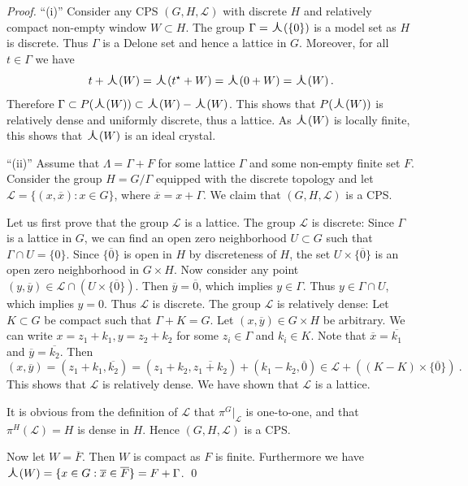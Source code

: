 \documentclass[11pt, a4wide]{amsart}
\newcommand{\oplam}{\mbox{\Large $\curlywedge$}}
\newcommand{\cL}{\mathcal L}
\numberwithin{lemma}{section}
\begin{document}
\begin{proof}

``(i)'' Consider any CPS $(G,H,\cL)$ with discrete $H$ and relatively compact non-empty window $W\subset H$.
The group $\Gamma= \oplam(\{ 0\})$ is a model set as $H$ is discrete. Thus $\Gamma$ is a Delone set and hence a  lattice in $G$. Moreover, for all $t \in \Gamma$ we have
\[
t+\oplam(W)=\oplam(t^\star+W)=\oplam(0+W)=\oplam(W) \,.
\]
Therefore $\Gamma \subset P(\oplam(W)) \subset \oplam(W)-\oplam(W)$. This shows that $ P(\oplam(W))$ is relatively dense and uniformly discrete, thus a lattice. As $\oplam(W)$ is locally finite, this shows that $\oplam(W)$ is an ideal crystal.

``(ii)''
Assume that $\Lambda=\Gamma+F$ for some lattice $\Gamma$ and some non-empty finite set $F$.
Consider the group $H = G/\Gamma$ equipped with the discrete topology and let
$\cL= \{ (x, \overline{x}) : x \in G \}$, where $\overline{x}= x+\Gamma$.  We claim that $(G, H, \cL)$ is a CPS.

Let us first prove that the group $\cL$ is a lattice.
The group $\cL$ is discrete: Since $\Gamma$ is a lattice in $G$, we can find an open zero neighborhood $U \subset G$ such that $\Gamma \cap U =\{ 0\}$. Since $\{ \overline{0} \}$ is open in $H$ by discreteness of $H$, the set $U \times \{ \overline{0} \}$ is an open zero neighborhood in $G \times H$. Now consider any point  $(y, \overline{y}) \in \cL \cap (U \times \{ \overline{0} \})$. Then $\overline{y}=\overline{0}$, which implies $y \in \Gamma$. Thus $y \in \Gamma \cap U$, which implies $y=0$. Thus $\cL$ is discrete.
The group $\cL$ is relatively dense: Let $K \subset G$ be compact such that $\Gamma +K =G$.
Let $(x, \overline{y}) \in G \times H$ be arbitrary. We can write $x = z_1+ k_1, y=z_2+k_2$ for some $z_i \in \Gamma$ and $ k_i\in K$. Note that $\overline{x}=\overline{k_1}$ and $\overline{y}=\overline{k_2}$. Then
\begin{displaymath}
(x, \overline{y})= (z_1+k_1, \overline{k_2})= (z_1+k_2, \overline{z_1+k_2}) +(k_1-k_2, \overline{0}) \in \cL + \left((K-K) \times \{\overline 0 \}\right) \ .
\end{displaymath}
%
This shows that $\cL$ is relatively dense. We have shown that $\cL$ is a lattice.

It is obvious from the definition of $\cL$ that $\pi^G|_\cL$ is one-to-one, and that $\pi^H(\cL)=H$ is dense in $H$. Hence $(G,H,\cL)$ is a CPS.

Now let $W=\overline{F}$. Then $W$ is compact as $F$ is finite. Furthermore we have $\oplam(W)=\{x\in G: \overline{x}\in\overline{F}\}=F+\Gamma$.
\qed
\end{proof}
\end{document}
